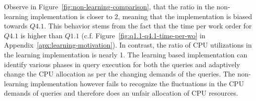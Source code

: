 Observe in Figure~\ref{fig:non-learning-comparison}, that the ratio in the non-learning implementation is closer to 2, meaning that the 
implementation is biased towards $Q4.1$. 
This behavior stems from the fact that the time per work order for $Q4.1$ is higher than $Q1.1$ (c.f. Figure~\ref{fig:q1.1-q4.1-time-per-wo} in Appendix~\ref{apx:learning-motivation}).
In contrast, the ratio of CPU utilizations in the learning implementation is nearly 1.
The learning based implementation can identify various phases in query execution for 
both the queries and adaptively change the CPU allocation as per the changing demands 
of the queries.
The non-learning implementation however fails to recognize the fluctuations in the CPU 
demands of queries and therefore does an unfair allocation of CPU resources.
%

